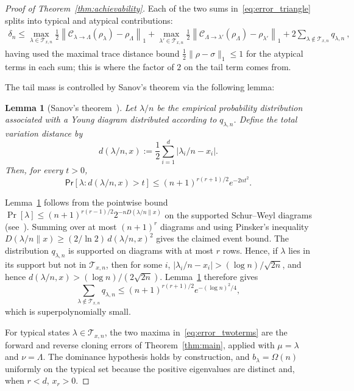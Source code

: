 \documentclass[a4paper,onecolumn,11pt]{quantumarticle}
\newtheorem{lem}{Lemma}
\def\map{\mathcal}
\begin{document}
\begin{proof}[Proof of Theorem~\ref{thm:achievability}]
Each of the two sums in~\eqref{eq:error_triangle} splits into typical and atypical contributions:
\begin{multline}\label{eq:error_twoterms}
\delta_n\le \max_{\lambda\in\mathcal{T}_{x,n}} \frac12\left\|\map{C}_{\lambda\to \Lambda}(\rho_\lambda)-\rho_{\Lambda}\right\|_1
+ \max_{\lambda'\in\mathcal{T}_{x,n}} \frac12\left\|\map{C}_{\Lambda\to \lambda'}(\rho_{\Lambda})-\rho_{\lambda'}\right\|_1
+2\sum_{\lambda\notin\mathcal T_{x,n}}q_{\lambda,n}\ ,
\end{multline}
having used the maximal trace distance bound $\frac12\|\rho-\sigma\|_1\le 1$ for the atypical terms in each sum; this is where the factor of $2$ on the tail term comes from.

The tail mass is controlled by Sanov's theorem via the following lemma:
\begin{lem}[Sanov's theorem~\cite{yang2016efficient,christandl2006spectra,o2021quantum,hayashi2017group}]\label{lem:tail_prob}
    Let $\lambda/n$ be the empirical probability distribution associated with a Young diagram distributed according to $q_{\lambda,n}$.
    Define the total variation distance by
    \[
        d(\lambda/n,x):=\frac12\sum_{i=1}^d|\lambda_i/n-x_i|.
    \]
    Then, for every $t>0$,
    \[
        \mathsf{Pr}\!\left[\lambda:d(\lambda/n,x)>t\right]
        \le (n+1)^{r(r+1)/2}e^{-2nt^2}.
    \]
\end{lem}
Lemma~\ref{lem:tail_prob} follows from the pointwise bound $\Pr[\lambda]\le(n+1)^{r(r-1)/2}2^{-nD(\lambda/n\|x)}$ on the supported Schur--Weyl diagrams (see~\cite{christandl2006spectra}). Summing over at most $(n+1)^r$ diagrams and using Pinsker's inequality $D(\lambda/n\|x)\ge(2/\ln2)\,d(\lambda/n,x)^2$ gives the claimed event bound.
The distribution $q_{\lambda,n}$ is supported on diagrams with at most $r$ rows. Hence, if $\lambda$ lies in its support but not in $\mathcal{T}_{x,n}$, then for some $i$,
$|\lambda_i/n-x_i|>(\log n)/\sqrt{2n}$, and hence
$d(\lambda/n,x)>(\log n)/(2\sqrt{2n})$. Lemma~\ref{lem:tail_prob} therefore gives
\begin{equation}\label{eq:tail_prob_bound}
    \sum_{\lambda\notin\mathcal T_{x,n}}q_{\lambda,n}
    \le (n+1)^{r(r+1)/2} e^{-(\log n)^2/4},
\end{equation}
which is superpolynomially small.

For typical states $\lambda\in\mathcal{T}_{x,n}$, the two maxima in~\eqref{eq:error_twoterms} are the forward and reverse cloning errors of Theorem~\ref{thm:main}, applied with $\mu=\lambda$ and $\nu=\Lambda$. The dominance hypothesis holds by construction, and $b_\lambda=\Omega(n)$ uniformly on the typical set because the positive eigenvalues are distinct and, when $r<d$, $x_r>0$.


\end{proof}
\end{document}
